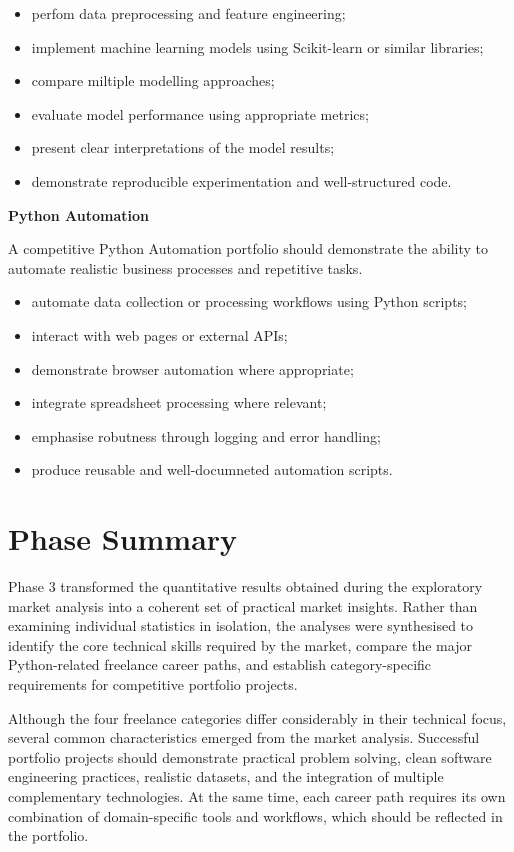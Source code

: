 \begin{itemize}
    \item perfom data preprocessing and feature engineering;
    \item implement machine learning models using Scikit-learn or similar libraries;
    \item compare miltiple modelling approaches;
    \item evaluate model performance using appropriate metrics;
    \item present clear interpretations of the model results;
    \item demonstrate reproducible experimentation and well-structured code.
\end{itemize}

\medskip
\textbf{Python Automation}

A competitive Python Automation portfolio should demonstrate the ability to automate realistic business processes and repetitive tasks.

\begin{itemize}
    \item automate data collection or processing workflows using Python scripts;
    \item interact with web pages or external APIs;
    \item demonstrate browser automation where appropriate;
    \item integrate spreadsheet processing where relevant;
    \item emphasise robutness through logging and error handling;
    \item produce reusable and well-documneted automation scripts.
\end{itemize}

\section[Phase 3 Summary]{Phase Summary}

Phase 3 transformed the quantitative results obtained during the exploratory market analysis into a coherent set of practical market insights.
Rather than examining individual statistics in isolation, the analyses were synthesised to identify the core technical skills required by the market,
compare the major Python-related freelance career paths, and establish category-specific requirements for competitive portfolio projects.

Although the four freelance categories differ considerably in their technical focus, several common characteristics emerged from the market analysis.
Successful portfolio projects should demonstrate practical problem solving, clean software engineering practices, realistic datasets, and the integration
of multiple complementary technologies. At the same time, each career path requires its own combination of domain-specific tools and workflows, which
should be reflected in the portfolio.

